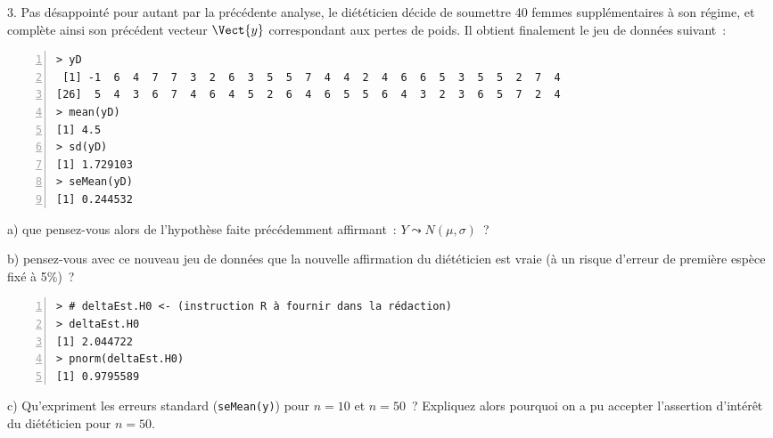 \documentclass[10pt]{report}
\begin{document}
\begin{exercice}
3. Pas d{\'e}sappoint{\'e} pour autant par la pr{\'e}c{\'e}dente analyse, le di{\'e}t{\'e}ticien d{\'e}cide de soumettre 40 femmes suppl{\'e}mentaires {\`a} son r{\'e}gime, et compl{\`e}te ainsi son pr{\'e}c{\'e}dent vecteur $\Vect{y}$ correspondant aux pertes de poids. Il obtient finalement le jeu de donn{\'e}es suivant~:

\IndicR
\begin{Verbatim}[frame=leftline,fontfamily=tt,fontshape=n,numbers=left]
> yD
 [1] -1  6  4  7  7  3  2  6  3  5  5  7  4  4  2  4  6  6  5  3  5  5  2  7  4
[26]  5  4  3  6  7  4  6  4  5  2  6  4  6  5  5  6  4  3  2  3  6  5  7  2  4
> mean(yD)
[1] 4.5
> sd(yD)
[1] 1.729103
> seMean(yD)
[1] 0.244532
\end{Verbatim}
 
 
a) que pensez-vous alors de l'hypoth{\`e}se faite pr{\'e}c{\'e}demment affirmant~: $Y\leadsto N\left( \mu ,\sigma \right) $~?



b) pensez-vous avec ce nouveau jeu de donn{\'e}es que la nouvelle affirmation du di{\'e}t{\'e}ticien est vraie ({\`a} un risque d'erreur de premi{\`e}re esp{\`e}ce fix{\'e} {\`a} 5\%)~?

\IndicR
\begin{Verbatim}[frame=leftline,fontfamily=tt,fontshape=n,numbers=left]
> # deltaEst.H0 <- (instruction R à fournir dans la rédaction)
> deltaEst.H0
[1] 2.044722
> pnorm(deltaEst.H0)
[1] 0.9795589
\end{Verbatim}




c) Qu'expriment les erreurs standard (\texttt{seMean(y)}) pour $n=10$ et $n=50$~? Expliquez alors pourquoi on a pu accepter l'assertion d'intérêt du diététicien pour $n=50$.


\end{exercice}
\end{document}
